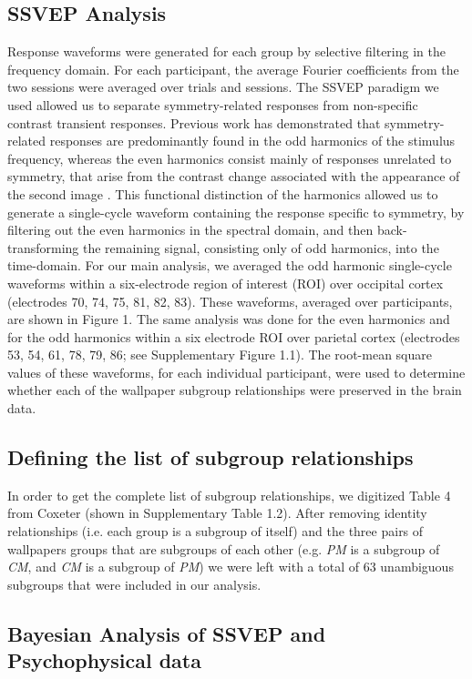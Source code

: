 \documentclass[11pt, twoside]{article}
\begin{document}
\subsection*{SSVEP Analysis}
Response waveforms were generated for each group by selective filtering in the frequency domain. For each participant, the average Fourier coefficients from the two sessions were averaged over trials and sessions. The SSVEP paradigm we used allowed us to separate symmetry-related responses from non-specific contrast transient responses. Previous work has demonstrated that symmetry-related responses are predominantly found in the odd harmonics of the stimulus frequency, whereas the even harmonics consist mainly of responses unrelated to symmetry, that arise from the contrast change associated with the appearance of the second image \citep{RN1954, RN1725}. This functional distinction of the harmonics allowed us to generate a single-cycle waveform containing the response specific to symmetry, by filtering out the even harmonics in the spectral domain, and then back-transforming the remaining signal, consisting only of odd harmonics, into the time-domain. For our main analysis, we averaged the odd harmonic single-cycle waveforms within a six-electrode region of interest (ROI) over occipital cortex (electrodes 70, 74, 75, 81, 82, 83). These waveforms, averaged over participants, are shown in Figure 1. The same analysis was done for the even harmonics and for the odd harmonics within a six electrode ROI over parietal cortex (electrodes 53, 54, 61, 78, 79, 86; see Supplementary Figure 1.1). The root-mean square values of these waveforms, for each individual participant, were used to determine whether each of the wallpaper subgroup relationships were preserved in the brain data.  

\subsection*{Defining the list of subgroup relationships}
In order to get the complete list of subgroup relationships, we digitized Table 4 from Coxeter \citep{RN1711} (shown in Supplementary Table 1.2). After removing identity relationships (i.e. each group is a subgroup of itself) and the three pairs of wallpapers groups that are subgroups of each other (e.g. \textit{PM} is a subgroup of \textit{CM}, and \textit{CM} is a subgroup of \textit{PM}) we were left with a total of 63 unambiguous subgroups that were included in our analysis. 

\subsection*{Bayesian Analysis of SSVEP and Psychophysical data}
\end{document}
